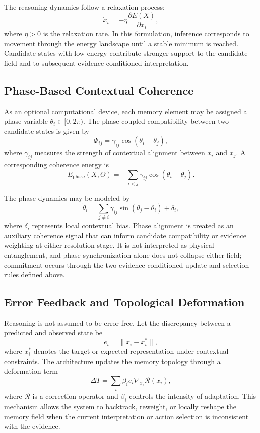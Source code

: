 \documentclass[10pt,journal,compsoc]{IEEEtran}
\begin{document}
The reasoning dynamics follow a relaxation process:
\[
\dot{x}_i = -\eta \frac{\partial E(X)}{\partial x_i},
\]
where $\eta > 0$ is the relaxation rate. In this formulation, inference corresponds to movement through the energy landscape until a stable minimum is reached. Candidate states with low energy contribute stronger support to the candidate field and to subsequent evidence-conditioned interpretation.

\subsection{Phase-Based Contextual Coherence}

As an optional computational device, each memory element may be assigned a phase variable $\theta_i \in [0, 2\pi)$. The phase-coupled compatibility between two candidate states is given by
\[
\Phi_{ij} = \gamma_{ij}\cos(\theta_i - \theta_j),
\]
where $\gamma_{ij}$ measures the strength of contextual alignment between $x_i$ and $x_j$. A corresponding coherence energy is
\[
E_{\text{phase}}(X,\Theta)
= -\sum_{i<j} \gamma_{ij}\cos(\theta_i - \theta_j).
\]

The phase dynamics may be modeled by
\[
\dot{\theta}_i =
\sum_{j \neq i} \gamma_{ij}\sin(\theta_j - \theta_i) + \delta_i,
\]
where $\delta_i$ represents local contextual bias. Phase alignment is treated as an auxiliary coherence signal that can inform candidate compatibility or evidence weighting at either resolution stage. It is not interpreted as physical entanglement, and phase synchronization alone does not collapse either field; commitment occurs through the two evidence-conditioned update and selection rules defined above.

\subsection{Error Feedback and Topological Deformation}

Reasoning is not assumed to be error-free. Let the discrepancy between a predicted and observed state be
\[
e_i = \|x_i - x_i^{\ast}\|,
\]
where $x_i^{\ast}$ denotes the target or expected representation under contextual constraints. The architecture updates the memory topology through a deformation term
\[
\Delta T = \sum_i \beta_i e_i \nabla_{x_i} \mathcal{R}(x_i),
\]
where $\mathcal{R}$ is a correction operator and $\beta_i$ controls the intensity of adaptation. This mechanism allows the system to backtrack, reweight, or locally reshape the memory field when the current interpretation or action selection is inconsistent with the evidence.
\end{document}
